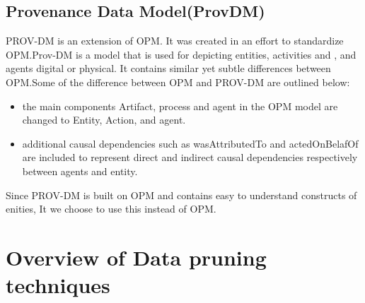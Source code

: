 
\subsection{Provenance Data Model(ProvDM)}

PROV-DM is an extension of OPM. It was created in an effort to standardize OPM.Prov-DM is a model that is used for depicting entities, activities and , and agents digital or physical.  It contains similar yet subtle differences between OPM.Some of the difference between OPM and PROV-DM are outlined below:

\begin{itemize}

\item the main components Artifact, process and agent in the OPM model are changed to Entity, Action, and agent. 

\item additional causal dependencies such as wasAttributedTo and actedOnBelafOf are included to represent direct and indirect causal dependencies respectively between agents and entity.

\end{itemize}



Since PROV-DM is built on OPM and contains easy to understand constructs of enities, It we choose to use this instead of OPM. 


\section{Overview of Data pruning techniques}

